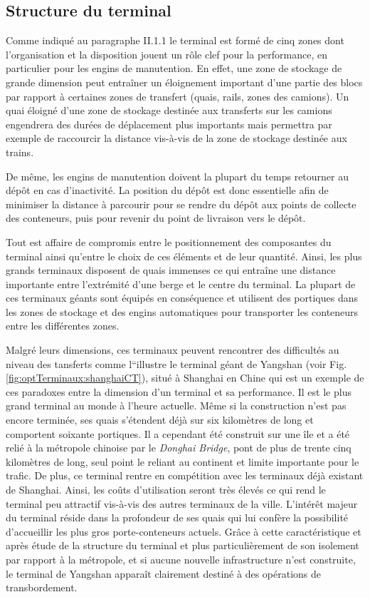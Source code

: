 \subsection{Structure du terminal}

Comme indiqué au paragraphe II.1.1 le terminal est formé de cinq zones dont l’organisation et la disposition jouent un rôle clef pour la performance, en particulier pour les engins de manutention.
En effet, une zone de stockage de grande dimension peut entraîner un éloignement important d’une partie des blocs par rapport à certaines zones de transfert (quais, rails, zones des camions). Un quai éloigné d'une zone de stockage destinée aux transferts sur les camions engendrera des durées de déplacement plus importants mais permettra par exemple de raccourcir la distance vis-à-vis de la zone de stockage destinée aux trains.

De même, les engins de manutention doivent la plupart du temps retourner au dépôt en cas d'inactivité. La position du dépôt est donc essentielle afin de minimiser la distance à parcourir pour se rendre du dépôt aux points de collecte des conteneurs, puis pour revenir du point de livraison vers le dépôt.

Tout est affaire de compromis entre le positionnement des composantes du terminal ainsi qu'entre le choix de ces éléments et de leur quantité. Ainsi, les plus grands terminaux disposent de quais immenses ce qui entraîne une distance importante entre l'extrémité d'une berge et le centre du terminal.
La plupart de ces terminaux géants sont équipés en conséquence et utilisent des portiques dans les zones de stockage et des engins automatiques pour transporter les conteneurs entre les différentes zones.

Malgré leurs dimensions, ces terminaux peuvent rencontrer des difficultés au niveau des tansferts comme l``illustre le terminal géant de Yangshan (voir Fig. \ref{fig:optTerminaux:shanghaiCT}), situé à Shanghai en Chine qui est un exemple de ces paradoxes entre la dimension d'un terminal et sa performance. Il est le plus grand terminal au monde à l'heure actuelle. Même si la construction n'est pas encore terminée, ses quais s'étendent déjà sur six kilomètres de long et comportent soixante portiques. 
Il a cependant été construit sur une île et a été relié à la métropole chinoise par le \textit{Donghai Bridge}, pont de plus de trente cinq kilomètres de long, seul point le reliant au continent et limite importante pour le trafic. 
De plus, ce terminal rentre en compétition avec les terminaux déjà existant de Shanghai. Ainsi, les coûts d'utilisation seront très élevés ce qui rend le terminal peu attractif vis-à-vis des autres terminaux de la 
ville. L'intérêt majeur du terminal réside dans la profondeur de ses quais qui lui confère la possibilité d'accueillir les plus gros porte-conteneurs actuels. Grâce à cette caractéristique et après étude de la structure du terminal et plus particulièrement de son isolement par rapport à la métropole, et si aucune nouvelle infrastructure n'est construite, le terminal de Yangshan apparaît clairement destiné à des opérations de transbordement.


